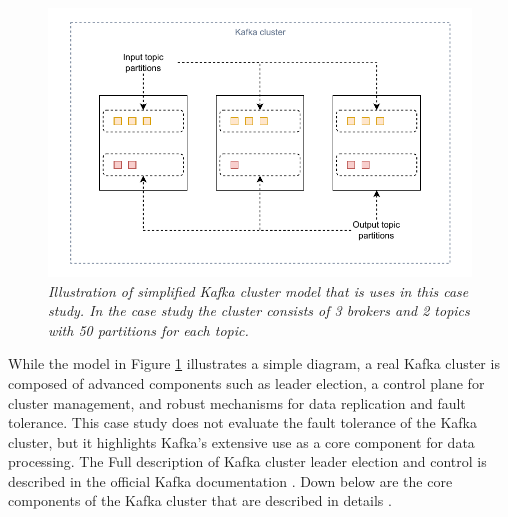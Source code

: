 \begin{figure}[H]
    \centering
    \includegraphics[width=1\textwidth]{figures/kafka-cluster}
    \caption{\textit{Illustration of simplified Kafka cluster model that is uses in this case study.
    In the case study the cluster consists of 3 brokers and 2 topics with 50 partitions for each topic.}}
    \label{fig:producer}
\end{figure}

While the model in Figure \ref{fig:producer} illustrates a simple diagram, a real Kafka cluster is composed of advanced
components such as leader election, a control plane for cluster management,
and robust mechanisms for data replication and fault tolerance.
This case study does not evaluate the fault tolerance of the Kafka cluster,
but it highlights Kafka's extensive use as a core component for data processing.
The Full description of Kafka cluster leader election and control is
described in the official Kafka documentation \cite{confluentControlPlane}.
Down below are the core components of the Kafka cluster that are described in details \cite{kafka2020}.

